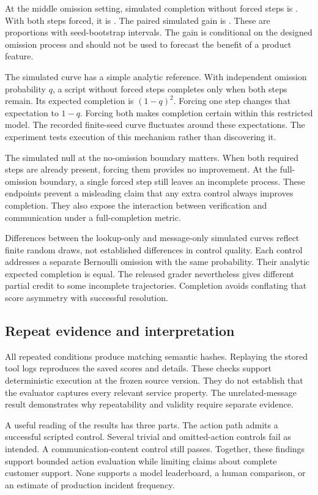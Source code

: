 \documentclass{article}
\begin{document}
At the middle omission setting, simulated completion without forced steps is \midRate{}. With both steps forced, it is \bothRate{}. The paired simulated gain is \midDelta{}. These are proportions with seed-bootstrap intervals. The gain is conditional on the designed omission process and should not be used to forecast the benefit of a product feature.
\sweepFigure

The simulated curve has a simple analytic reference. With independent omission probability $q$, a script without forced steps completes only when both steps remain. Its expected completion is $(1-q)^2$. Forcing one step changes that expectation to $1-q$. Forcing both makes completion certain within this restricted model. The recorded finite-seed curve fluctuates around these expectations. The experiment tests execution of this mechanism rather than discovering it.

The simulated null at the no-omission boundary matters. When both required steps are already present, forcing them provides no improvement. At the full-omission boundary, a single forced step still leaves an incomplete process. These endpoints prevent a misleading claim that any extra control always improves completion. They also expose the interaction between verification and communication under a full-completion metric.

Differences between the lookup-only and message-only simulated curves reflect finite random draws, not established differences in control quality. Each control addresses a separate Bernoulli omission with the same probability. Their analytic expected completion is equal. The released grader nevertheless gives different partial credit to some incomplete trajectories. Completion avoids conflating that score asymmetry with successful resolution.
\subsection{Repeat evidence and interpretation}
All repeated conditions produce matching semantic hashes. Replaying the stored tool logs reproduces the saved scores and details. These checks support deterministic execution at the frozen source version. They do not establish that the evaluator captures every relevant service property. The unrelated-message result demonstrates why repeatability and validity require separate evidence.

A useful reading of the results has three parts. The action path admits a successful scripted control. Several trivial and omitted-action controls fail as intended. A communication-content control still passes. Together, these findings support bounded action evaluation while limiting claims about complete customer support. None supports a model leaderboard, a human comparison, or an estimate of production incident frequency.
\end{document}
